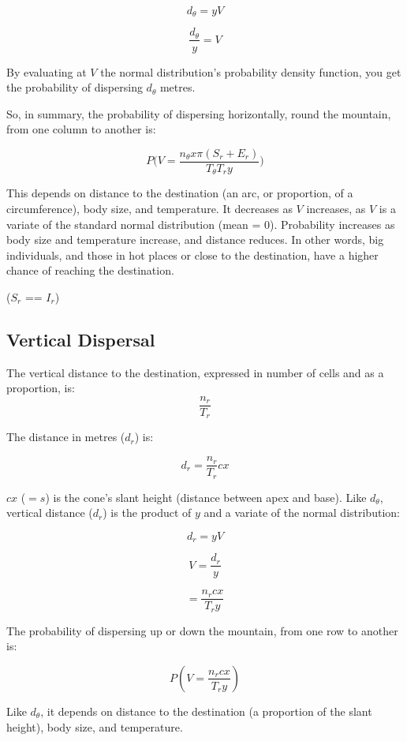 \documentclass[11pt]{article}
\begin{document}
$$d_\theta = yV$$

$$\frac{d_\theta}{y} = V$$

By evaluating at $V$ the normal distribution's probability density function, you get the probability of dispersing $d_\theta$ metres.

So, in summary, the probability of dispersing horizontally, round the mountain, from one column to another is:

$$P\Big(V = \frac{n_\theta x \pi (S_r + E_r)}{T_\theta T_r y}\Big)$$

This depends on distance to the destination (an arc, or proportion, of a circumference), body size, and temperature. It decreases as $V$ increases, as $V$ is a variate of the standard normal distribution (mean = 0). Probability increases as body size and temperature increase, and distance reduces. In other words, big individuals, and those in hot places or close to the destination, have a higher chance of reaching the destination.

($S_r$ == $I_r$)

\subsection*{Vertical Dispersal}
The vertical distance to the destination, expressed in number of cells and as a proportion, is:
$$\frac{n_r}{T_r}$$

The distance in metres ($d_r$) is:

$$d_r = \frac{n_r}{T_r} cx$$

$cx$ ($= s$) is the cone's slant height (distance between apex and base). Like $d_\theta$, vertical distance ($d_r$) is the product of $y$ and a variate of the normal distribution:

$$d_r = yV$$

$$V = \frac{d_r}{y}$$

$$= \frac{n_r cx}{T_r y}$$

The probability of dispersing up or down the mountain, from one row to another is:

$$P(V = \frac{n_r cx}{T_r y})$$

Like $d_\theta$, it depends on distance to the destination (a proportion of the slant height), body size, and temperature.
\end{document}
